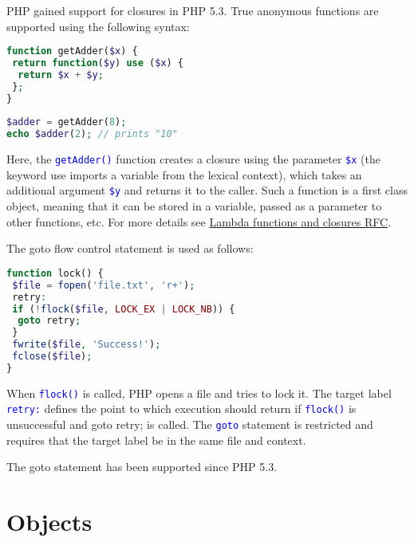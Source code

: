 PHP gained support for closures in PHP 5.3. True anonymous functions are supported using the following syntax:


\begin{lstlisting}[language=PHP]
function getAdder($x) {
 return function($y) use ($x) {
  return $x + $y;
 };
}
 
$adder = getAdder(8);
echo $adder(2); // prints "10"
\end{lstlisting}


Here, the  \textcolor{Blue}{\texttt{getAdder()}} function creates a closure using the parameter  \textcolor{Blue}{\texttt{\$x}} (the keyword use imports a variable from the lexical context), which takes an additional argument  \textcolor{Blue}{\texttt{\$y}} and returns it to the caller. Such a function is a first class object, meaning that it can be stored in a variable, passed as a parameter to other functions, etc. For more details see \href{http://wiki.php.net/rfc/closures}{Lambda functions and closures RFC}.


The goto flow control statement is used as follows:

\begin{lstlisting}[language=PHP]
function lock() {
 $file = fopen('file.txt', 'r+');
 retry:
 if (!flock($file, LOCK_EX | LOCK_NB)) {
  goto retry;
 }
 fwrite($file, 'Success!');
 fclose($file);
}
\end{lstlisting}


When \textcolor{Blue}{\texttt{flock()}} is called, PHP opens a file and tries to lock it. The target label \textcolor{Blue}{\texttt{retry:}} defines the point to which execution should return if \textcolor{Blue}{\texttt{flock()}} is unsuccessful and goto retry; is called. The \textcolor{Blue}{\texttt{goto}} statement is restricted and requires that the target label be in the same file and context.

The goto statement has been supported since PHP 5.3.


\section{Objects}


